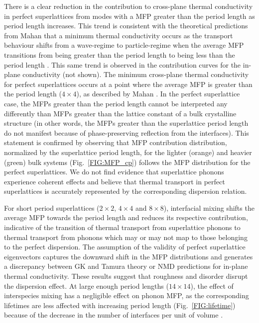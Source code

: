 There is a clear reduction in the contribution to cross-plane thermal conductivity in perfect superlattices from modes with a MFP greater than the period length as period length increases. This trend is consistent with the theoretical predictions from Mahan that a minimum thermal conductivity occurs as the transport behaviour shifts from a wave-regime to particle-regime when the average MFP transitions from being greater than the period length to being less than the period length \cite{PhysRevLett.84.927,PhysRevB.56.10754}. This same trend is observed in the contribution curves for the in-plane conductivity (not shown). The minimum cross-plane thermal conductivity for perfect superlattices occurs at a point where the average MFP is greater than the period length ($4 \times 4$), as described by Mahan \cite{PhysRevLett.84.927}. In the perfect superlattice case, the MFPs greater than the period length cannot be interpreted any differently than MFPs greater than the lattice constant of a bulk crystalline structure (in other words, the MFPs greater than the superlattice period length do not manifest because of phase-preserving reflection from the interfaces). This statement is confirmed by observing that MFP contribution distribution, normalized by the superlattice period length, for the lighter (orange) and heavier (green) bulk systems (Fig.~\ref{FIG:MFP_cp}) follows the MFP distribution for the perfect superlattices. We do not find evidence that superlattice phonons experience coherent effects and believe that thermal transport in perfect superlattices is accurately represented by the corresponding dispersion relation.%

For short period superlattices ($2\times2$, $4\times4$ and $8\times8$), interfacial mixing shifts the average MFP towards the period length and reduces its respective contribution, indicative of the transition of thermal transport from superlattice phonons to thermal transport from phonons which may or may not map to those belonging to the perfect dispersion. %
The assumption of the validity of perfect superlattice eigenvectors captures the downward shift in the MFP distributions and generates a discrepancy between GK and Tamura theory or NMD predictions for in-plane thermal conductivity. These results suggest that roughness and disorder disrupt the dispersion effect. At large enough period lengths ($14\times14$), the effect of interspecies mixing has a negligible effect on phonon MFP, as the corresponding lifetimes are less affected with increasing period length (Fig.~\ref{FIG:lifetime}) because of the decrease in the number of interfaces per unit of volume \cite{PhysRevB.79.075316}.

